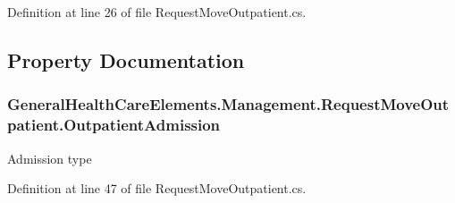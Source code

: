 Definition at line 26 of file Request\+Move\+Outpatient.\+cs.



\subsection{Property Documentation}
\subsubsection[{\texorpdfstring{Outpatient\+Admission}{OutpatientAdmission}}]{ General\+Health\+Care\+Elements.\+Management.\+Request\+Move\+Outpatient.\+Outpatient\+Admission\hspace{0.3cm}{\ttfamily [get]}}\hypertarget{class_general_health_care_elements_1_1_management_1_1_request_move_outpatient_a1afd5abf5cf9bdae896b891c9d97bbb7}{}\label{class_general_health_care_elements_1_1_management_1_1_request_move_outpatient_a1afd5abf5cf9bdae896b891c9d97bbb7}


Admission type 



Definition at line 47 of file Request\+Move\+Outpatient.\+cs.

